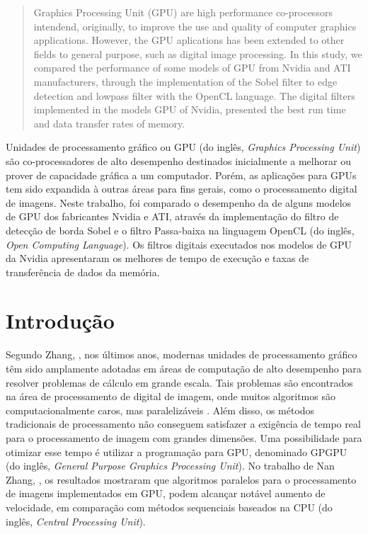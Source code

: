 \maketitle
\begin{abstract}
Graphics Processing Unit (GPU) are high performance co-processors intendend, originally, to improve the use and quality of computer graphics applications.  However, the GPU aplications has been extended to other fields to general purpose, such as digital image processing. In this study, we compared the performance of some models of GPU from Nvidia and ATI manufacturers, through the implementation of the  Sobel filter to edge detection and  lowpass filter with the OpenCL language. The digital filters implemented in the models GPU of Nvidia, presented the best run time and data transfer rates of memory.

\end{abstract}
\begin{resumo}
Unidades de processamento gráfico ou GPU  (do inglês,  \textit{Graphics Processing Unit})  são co-processadores de alto desempenho destinados inicialmente a melhorar ou prover de capacidade gráfica a um computador. Porém, as aplicações para GPUs tem sido expandida à outras áreas para fins gerais, como o processamento digital de imagens. Neste trabalho, foi comparado o desempenho da de alguns modelos de GPU dos fabricantes Nvidia e ATI, através da implementação do filtro de detecção de borda Sobel e o filtro Passa-baixa na linguagem OpenCL (do inglês, \textit{Open Computing Language}). Os filtros digitais executados nos modelos de GPU da Nvidia apresentaram os melhores de tempo de execução e taxas de transferência de dados da memória.
\end{resumo}

\section{Introdução}
Segundo Zhang, \cite{ArchComp}, nos últimos anos, modernas unidades de processamento gráfico têm sido amplamente adotadas em áreas de computação de alto desempenho para resolver problemas de cálculo em grande escala.  
Tais problemas são encontrados na área de processamento de digital de imagem, onde muitos algoritmos são computacionalmente caros, mas paralelizáveis \cite{Gonzalez:2006:DIP:1076432}. Além disso, os métodos tradicionais de processamento não conseguem satisfazer a exigência de tempo real para o processamento de imagem com grandes dimensões. Uma possibilidade para otimizar esse tempo é utilizar a programação para GPU, denominado GPGPU (do inglês, \textit{General Purpose Graphics Processing Unit}). No trabalho de Nan Zhang, \cite{ImgParallel}, os resultados mostraram que algoritmos paralelos para o processamento de imagens implementados em GPU, podem alcançar notável aumento de velocidade, em comparação com métodos sequenciais baseados na CPU (do inglês, \textit{Central  Processing  Unit}). 

